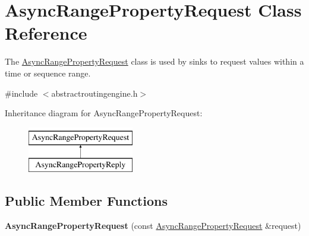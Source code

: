 \hypertarget{classAsyncRangePropertyRequest}{\section{Async\-Range\-Property\-Request Class Reference}
\label{classAsyncRangePropertyRequest}
}


The \hyperlink{classAsyncRangePropertyRequest}{Async\-Range\-Property\-Request} class is used by sinks to request values within a time or sequence range.  




{\ttfamily \#include $<$abstractroutingengine.\-h$>$}

Inheritance diagram for Async\-Range\-Property\-Request\-:\begin{figure}[H]
\begin{center}
\leavevmode
\includegraphics[height=2.000000cm]{classAsyncRangePropertyRequest}
\end{center}
\end{figure}
\subsection*{Public Member Functions}
\begin{DoxyCompactItemize}
\item 
\hypertarget{classAsyncRangePropertyRequest_aefe0f0167ce9bcabcd4450a21c7ea0e5}{{\bfseries Async\-Range\-Property\-Request} (const \hyperlink{classAsyncRangePropertyRequest}{Async\-Range\-Property\-Request} \&request)}\label{classAsyncRangePropertyRequest_aefe0f0167ce9bcabcd4450a21c7ea0e5}

\end{DoxyCompactItemize}
